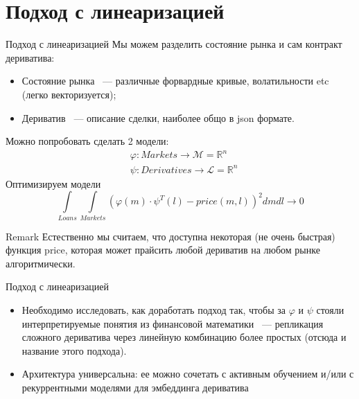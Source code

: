 \documentclass[10pt]{beamer}
\newcommand{\R}{\ensuremath{\mathbb{R}}}
\renewcommand{\phi}{\varphi}
\begin{document}
    \section{Подход с линеаризацией}
    \begin{frame}{Подход с линеаризацией}
        Мы можем разделить состояние рынка и сам контракт дериватива:
        \begin{itemize}
            \item Состояние рынка ~--- различные форвардные кривые, волатильности etc (легко векторизуется);
            \item Дериватив ~--- описание сделки, наиболее общо в json формате.
        \end{itemize}

        Можно попробовать сделать 2 модели:
        \begin{align*}
            & \phi: Markets \to \mathcal{M} = \R^n \\
            & \psi: Derivatives \to \mathcal{L} = \R^n
        \end{align*}
        Оптимизируем модели 
        \[
            \int\limits_{Loans}\int\limits_{Markets}\left( \phi(m) \cdot \psi^T(l) - price(m, l) \right)^2 dm dl \to 0
        \]

        \begin{block}{Remark}
            Естественно мы считаем, что доступна некоторая (не очень быстрая) функция price, которая может прайсить любой дериватив на любом рынке алгоритмически.
        \end{block}
    \end{frame}

    \begin{frame}{Подход с линеаризацией}
        \begin{itemize}
            \item Необходимо исследовать, как доработать подход так, чтобы за $\phi$ и $\psi$ стояли интерпретируемые понятия из финансовой математики 
            ~--- репликация сложного дериватива через линейную комбинацию более простых (отсюда и название этого подхода).
            \item Архитектура универсальна: ее можно сочетать с активным обучением и/или с рекуррентными моделями для эмбеддинга дериватива
        \end{itemize}
    \end{frame}
\end{document}
